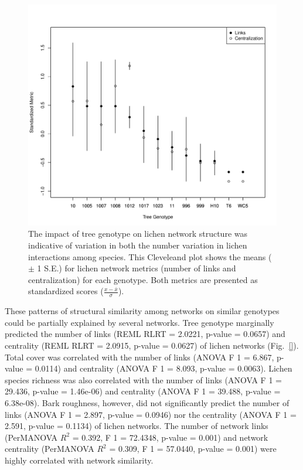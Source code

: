 \documentclass[9pt,twocolumn,twoside,lineno]{pnas-new}
\begin{document}
{\begin{figure}[ht]
\centering
\includegraphics[width=\linewidth]{cn_metrics.pdf}
\caption{The impact of tree genotype on lichen network structure was
  indicative of variation in both the number variation in lichen
  interactions among species. This Cleveleand plot shows the means
  ($\pm$ 1 S.E.) for lichen network metrics (number of links and
  centralization) for each genotype. Both metrics are presented as
  standardized scores ($\frac{x - \bar{x}}{\sigma}$).}
\label{fig:cn_metrics}
\end{figure}


These patterns of structural similarity among networks on similar
genotypes could be partially explained by several networks. Tree
genotype marginally predicted the number of links (REML RLRT = 2.0221,
p-value = 0.0657) and centrality (REML RLRT = 2.0915, p-value =
0.0627) of lichen networks (Fig.~\ref{}). Total cover was correlated with the number
of links (ANOVA F 1 = 6.867, p-value = 0.0114) and centrality (ANOVA F
1 = 8.093, p-value = 0.0063). Lichen species richness was also
correlated with the number of links (ANOVA F 1 = 29.436, p-value =
1.46e-06) and centrality (ANOVA F 1 = 39.488, p-value =
6.38e-08). Bark roughness, however, did not significantly predict the
number of links (ANOVA F 1 = 2.897, p-value = 0.0946) nor the
centrality (ANOVA F 1 = 2.591, p-value = 0.1134) of lichen networks.
The number of network links (PerMANOVA $R^2$ = 0.392, F 1 = 72.4348,
p-value = 0.001) and network centrality (PerMANOVA $R^2$ = 0.309, F 1 =
57.0440, p-value = 0.001) were highly correlated with network
similarity.



}
\end{document}
